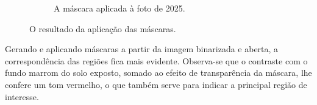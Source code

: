 \documentclass{article}
\begin{document}
\begin{figure}[H]
\begin{subfigure}[b]{0.48\textwidth}
        \caption{A máscara aplicada à foto de 2025.}
        \label{2025}
    \end{subfigure}
    \caption{O resultado da aplicação das máscaras.}
    \label{máscara}
\end{figure}

Gerando e aplicando máscaras a partir da imagem binarizada e aberta, a correspondência das regiões fica mais evidente. Observa-se que o contraste com o fundo marrom do solo exposto, somado ao efeito de transparência da máscara, lhe confere um tom vermelho, o que também serve para indicar a principal região de interesse.

\nocite{*}


\end{document}
